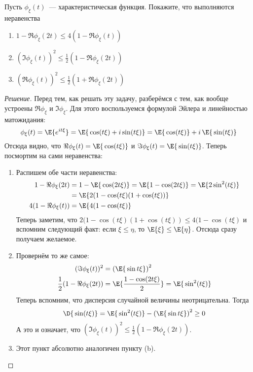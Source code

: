 \begin{problem}
	Пусть \(\phi_{\xi}(t)\)~--- характеристическая функция. Покажите, что 
	выполняются неравенства
	\begin{enumerate}[label=(\alph*)]
		\item \(1 - \Re \phi_{\xi}(2t) \leq 4(1 - \Re \phi_{\xi}(t))\)
		\item \((\Im \phi_{\xi}(t))^2 \leq \frac{1}{2}(1 - \Re\phi_{\xi}(2t))\)
		\item \((\Re \phi_{\xi}(t))^2 \leq \frac{1}{2}(1 + \Re\phi_{\xi}(2t))\)
	\end{enumerate}
\end{problem}
\begin{proof}[Решение]
	Перед тем, как решать эту задачу, разберёмся с тем, как вообще устроены 
	\(\Re \phi_{\xi}\) и \(\Im \phi_{\xi}\). Для этого воспользуемся формулой 
	Эйлера и линейностью матожидания:
	\[
	\phi_{\xi}(t) = \E{e^{it\xi}} = \E{\,\cos(t\xi) + i\sin(t\xi)} = 
	\E{\,\cos(t\xi)} + i\,\E{\,\sin(t\xi)}
	\]
	Отсюда видно, что \(\Re \phi_{\xi}(t) = \E{\,\cos(t\xi)}\) и \(\Im 
	\phi_{\xi}(t) = \E{\,\sin(t\xi)}\).
	Теперь посмортим на сами неравенства:
	\begin{enumerate}[label=(\alph*)]
		\item Распишем обе части неравенства:
		\begin{align*}
			1 - \Re \phi_{\xi}(2t) &= 1 - \E{\,\cos(2t\xi)} = \E{1 - 
			\cos(2t\xi)} = \E{2\sin^2(t\xi)} \\
			&= \E{2(1 - \cos(t\xi)(1 + \cos(t\xi))} \\
			4(1 - \Re \phi_{\xi}(t)) &= \E{4(1 - \cos(t\xi)}
		\end{align*}
		Теперь заметим, что \(2(1 - \cos(t\xi)(1 + \cos(t\xi)) \leq 4(1 - 
		\cos(t\xi)\) и вспомним следующий факт: если \(\xi \leq \eta\), то 
		\(\E{\xi} \leq \E{\eta}\). Отсюда сразу получаем желаемое.
		\item Провернём то же самое:
		\begin{align*}
			(\Im \phi_{\xi}(t))^2 &= \left(\E{\,\sin{t\xi}}\right)^2 \\
			\frac{1}{2}(1 - \Re\phi_{\xi}(2t)) &= \E{\frac{1 - \cos(2t\xi)}{2}} 
			= \E{\,\sin^2(t\xi)}
		\end{align*}
		Теперь вспомним, что дисперсия случайной величины неотрицательна. Тогда
		\[
		\D{\,\sin(t\xi)} = \E{\,\sin^2(t\xi)} - \left(\E{\,\sin{t\xi}}\right)^2 
		\geq 0
		\]
		А это и означает, что \((\Im \phi_{\xi}(t))^2 \leq \frac{1}{2}(1 - 
		\Re\phi_{\xi}(2t))\).
		\item Этот пункт абсолютно аналогичен пункту (b).
	\end{enumerate}
\end{proof}

